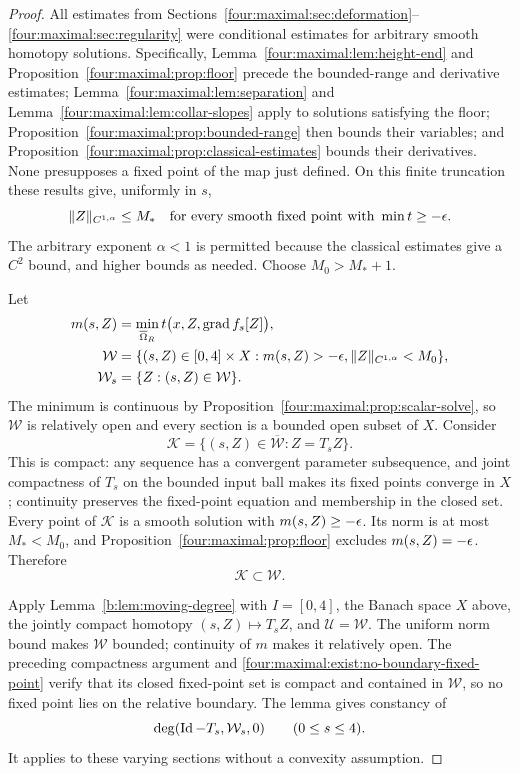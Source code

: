 \begin{proof}
All estimates from Sections~\ref{four:maximal:sec:deformation}--\ref{four:maximal:sec:regularity}
were conditional estimates for arbitrary smooth homotopy solutions.
Specifically, Lemma~\ref{four:maximal:lem:height-end} and Proposition~\ref{four:maximal:prop:floor}
precede the bounded-range and derivative estimates;
Lemma~\ref{four:maximal:lem:separation} and Lemma~\ref{four:maximal:lem:collar-slopes} apply to
solutions satisfying the floor;
Proposition~\ref{four:maximal:prop:bounded-range} then bounds their variables;
and Proposition~\ref{four:maximal:prop:classical-estimates} bounds their
derivatives.  None presupposes a fixed point of the map just defined.
On this finite truncation these results give, uniformly in $s$,
\[
 \|Z\|_{C^{1,\alpha}}\le M_*
 \quad\text{for every smooth fixed point with }\min t\ge-\epsilon.
\]
The arbitrary exponent $\alpha<1$ is permitted because the classical
estimates give a $C^2$ bound, and higher bounds as needed.  Choose
$M_0>M_*+1$.

Let
\begin{equation}\label{four:maximal:exist:floor-sections}
 \begin{split}
 m(s,Z)&=\min_{\overline\Omega_R}t\bigl(x,Z,\operatorname{grad} f_s[Z]\bigr),\\
 \mathcal W&=\{(s,Z)\in[0,4]\times X:
            m(s,Z)>-\epsilon, \|Z\|_{C^{1,\alpha}}<M_0\},\\
 \mathcal W_s&=\{Z:(s,Z)\in\mathcal W\}.
 \end{split}
\end{equation}
The minimum is continuous by Proposition~\ref{four:maximal:prop:scalar-solve},
so $\mathcal W$ is relatively open and every section is a bounded
open subset of $X$.  Consider
\[
 \mathcal K=
 \{(s,Z)\in\overline{\mathcal W}:Z=T_sZ\}.
\]
This is compact: any sequence has a convergent parameter subsequence,
and joint compactness of $T_s$ on the bounded input ball makes its
fixed points converge in $X$; continuity preserves the fixed-point
equation and membership in the closed set.
Every point of $\mathcal K$ is a smooth solution with
$m(s,Z)\ge-\epsilon$.  Its norm is at most $M_*<M_0$, and
Proposition~\ref{four:maximal:prop:floor} excludes $m(s,Z)=-\epsilon$.
Therefore
\begin{equation}\label{four:maximal:exist:no-boundary-fixed-point}
 \mathcal K\subset\mathcal W.
\end{equation}

Apply Lemma~\ref{b:lem:moving-degree} with $I=[0,4]$, the Banach
space $X$ above, the jointly compact homotopy $(s,Z)\mapsto T_sZ$, and
$\mathcal U=\mathcal W$.  The uniform norm bound makes $\mathcal W$
bounded; continuity of $m$ makes it relatively open.  The preceding
compactness argument and \eqref{four:maximal:exist:no-boundary-fixed-point}
verify that its closed fixed-point set is compact and contained in
$\mathcal W$, so no fixed point lies on the relative boundary.
The lemma gives constancy of
\[
 \deg(\operatorname{Id}-T_s,\mathcal W_s,0)\qquad (0\le s\le4).
\]
It applies to these varying sections without a convexity assumption.


\end{proof}
